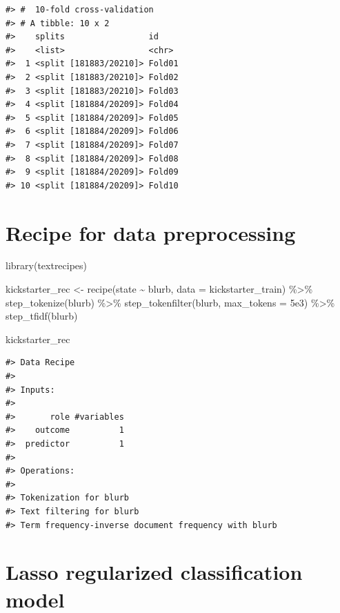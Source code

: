 \documentclass[
]{krantz}
\makeatletter
\newenvironment{Shaded}{\begin{snugshade}}{\end{snugshade}}
\newcommand{\AttributeTok}[1]{\textcolor[rgb]{0.77,0.63,0.00}{#1}}
\newcommand{\FloatTok}[1]{\textcolor[rgb]{0.00,0.00,0.81}{#1}}
\newcommand{\FunctionTok}[1]{\textcolor[rgb]{0.00,0.00,0.00}{#1}}
\newcommand{\NormalTok}[1]{#1}
\newcommand{\OtherTok}[1]{\textcolor[rgb]{0.56,0.35,0.01}{#1}}
\newcommand{\SpecialCharTok}[1]{\textcolor[rgb]{0.00,0.00,0.00}{#1}}
\newenvironment{kframe}{%
\medskip{}
\setlength{\fboxsep}{.8em}
 \def\at@end@of@kframe{}%
 \ifinner\ifhmode%
  \def\at@end@of@kframe{\end{minipage}}%
  \begin{minipage}{\columnwidth}%
 \fi\fi%
 \def\FrameCommand##1{\hskip\@totalleftmargin \hskip-\fboxsep
 \colorbox{shadecolor}{##1}\hskip-\fboxsep
     \hskip-\linewidth \hskip-\@totalleftmargin \hskip\columnwidth}%
 \MakeFramed {\advance\hsize-\width
   \@totalleftmargin\z@ \linewidth\hsize
   \@setminipage}}%
 {\par\unskip\endMakeFramed%
 \at@end@of@kframe}
\renewenvironment{Shaded}{\begin{kframe}}{\end{kframe}}
\makeatother
\begin{document}
\begin{verbatim}
#> #  10-fold cross-validation 
#> # A tibble: 10 x 2
#>    splits                 id    
#>    <list>                 <chr> 
#>  1 <split [181883/20210]> Fold01
#>  2 <split [181883/20210]> Fold02
#>  3 <split [181883/20210]> Fold03
#>  4 <split [181884/20209]> Fold04
#>  5 <split [181884/20209]> Fold05
#>  6 <split [181884/20209]> Fold06
#>  7 <split [181884/20209]> Fold07
#>  8 <split [181884/20209]> Fold08
#>  9 <split [181884/20209]> Fold09
#> 10 <split [181884/20209]> Fold10
\end{verbatim}

\hypertarget{recipe-for-data-preprocessing}{%
\section{Recipe for data preprocessing}\label{recipe-for-data-preprocessing}}

\begin{Shaded}
\begin{Highlighting}[]
\FunctionTok{library}\NormalTok{(textrecipes)}

\NormalTok{kickstarter\_rec }\OtherTok{\textless{}{-}} \FunctionTok{recipe}\NormalTok{(state }\SpecialCharTok{\textasciitilde{}}\NormalTok{ blurb, }\AttributeTok{data =}\NormalTok{ kickstarter\_train) }\SpecialCharTok{\%\textgreater{}\%}
  \FunctionTok{step\_tokenize}\NormalTok{(blurb) }\SpecialCharTok{\%\textgreater{}\%}
  \FunctionTok{step\_tokenfilter}\NormalTok{(blurb, }\AttributeTok{max\_tokens =} \FloatTok{5e3}\NormalTok{) }\SpecialCharTok{\%\textgreater{}\%}
  \FunctionTok{step\_tfidf}\NormalTok{(blurb)}

\NormalTok{kickstarter\_rec}
\end{Highlighting}
\end{Shaded}

\begin{verbatim}
#> Data Recipe
#> 
#> Inputs:
#> 
#>       role #variables
#>    outcome          1
#>  predictor          1
#> 
#> Operations:
#> 
#> Tokenization for blurb
#> Text filtering for blurb
#> Term frequency-inverse document frequency with blurb
\end{verbatim}

\hypertarget{lasso-regularized-classification-model}{%
\section{Lasso regularized classification model}\label{lasso-regularized-classification-model}}
\end{document}
